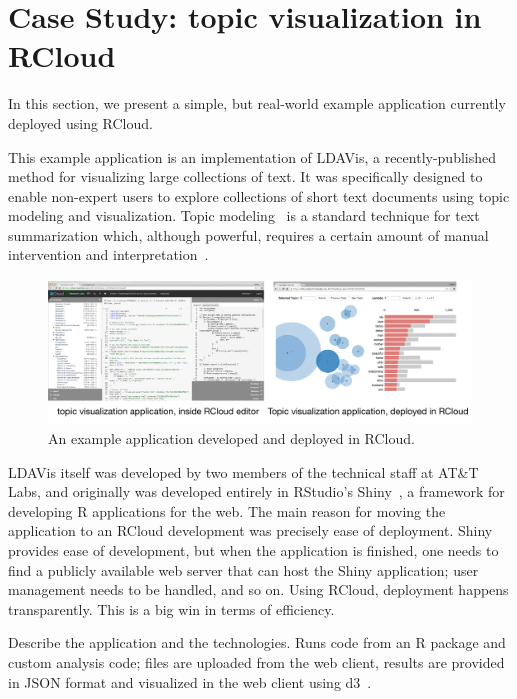 \section{Case Study\label{sec:casestudy}: topic visualization in RCloud}

In this section, we present a simple, but real-world example
application currently deployed using RCloud.

This example application is an implementation of LDAVis, a
recently-published method for visualizing large collections of
text. It was specifically designed to enable non-expert users to
explore collections of short text documents using topic modeling and
visualization. Topic modeling~\cite{Blei:2003:LDA} is a standard
technique for text summarization which, although powerful, requires a
certain amount of manual intervention and
interpretation~\cite{Siever:2014:LAM}.

\begin{figure}
  \includegraphics[width=\linewidth]{fig/casestudytext/casestudytext.pdf}
  \caption{\label{fig:textvis}An example application developed and deployed in RCloud.}
\end{figure}

LDAVis itself was developed by two members of the technical staff at
AT\&T Labs, and originally was developed entirely in RStudio's
Shiny~\cite{RStudio:2013:SWA}, a framework for developing R
applications for the web. The main reason for moving the application
to an RCloud development was precisely ease of deployment. Shiny
provides ease of development, but when the application is finished,
one needs to find a publicly available web server that can host the
Shiny application; user management needs to be handled, and so
on. Using RCloud, deployment happens transparently. This is a big win
in terms of efficiency.

Describe the application and the technologies. Runs code from an R
package and custom analysis code; files are uploaded from the web
client, results are provided in JSON format and visualized in the web
client using d3~\cite{Bostock:2011:DDD}.



